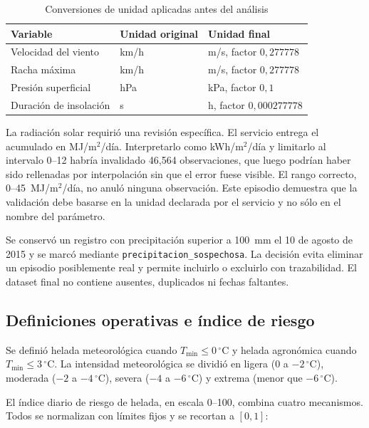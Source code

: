\documentclass[11pt,a4paper]{article}
\begin{document}
\begin{table}[H]
\centering
\caption{Conversiones de unidad aplicadas antes del análisis}
\label{tab:conversiones}
\small
\begin{tabular}{lll}
\toprule
Variable & Unidad original & Unidad final \\
\midrule
Velocidad del viento & km/h & m/s, factor $0{,}277778$ \\
Racha máxima & km/h & m/s, factor $0{,}277778$ \\
Presión superficial & hPa & kPa, factor $0{,}1$ \\
Duración de insolación & s & h, factor $0{,}000277778$ \\
\bottomrule
\end{tabular}
\end{table}

La radiación solar requirió una revisión específica. El servicio entrega el acumulado en
MJ/m$^2$/día. Interpretarlo como kWh/m$^2$/día y limitarlo al intervalo 0--12 habría
invalidado 46,564 observaciones, que luego podrían haber sido rellenadas por interpolación
sin que el error fuese visible. El rango correcto, 0--45~MJ/m$^2$/día, no anuló ninguna
observación. Este episodio demuestra que la validación debe basarse en la unidad declarada
por el servicio y no sólo en el nombre del parámetro.

Se conservó un registro con precipitación superior a 100~mm el 10 de agosto de 2015 y se
marcó mediante \texttt{precipitacion\_sospechosa}. La decisión evita eliminar un episodio
posiblemente real y permite incluirlo o excluirlo con trazabilidad. El dataset final no
contiene ausentes, duplicados ni fechas faltantes.

\subsection{Definiciones operativas e índice de riesgo}

Se definió helada meteorológica cuando $T_{\min}\leq 0\,^{\circ}\mathrm{C}$ y helada agronómica
cuando $T_{\min}\leq 3\,^{\circ}\mathrm{C}$. La intensidad meteorológica se dividió en ligera
(0 a $-2\,^{\circ}\mathrm{C}$), moderada ($-2$ a $-4\,^{\circ}\mathrm{C}$), severa ($-4$ a
$-6\,^{\circ}\mathrm{C}$) y extrema (menor que $-6\,^{\circ}\mathrm{C}$).

El índice diario de riesgo de helada, en escala 0--100, combina cuatro mecanismos. Todos
se normalizan con límites fijos y se recortan a $[0,1]$:
\end{document}
